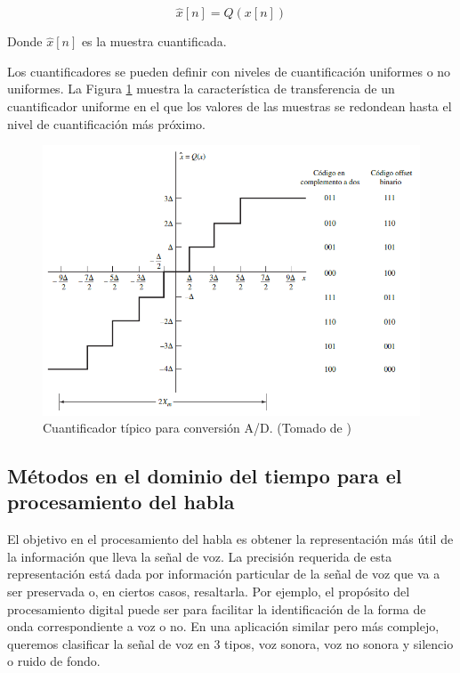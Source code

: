 \begin{equation}\label{eq:cuantificador}
	\hat{x}[n]=Q(x[n])
\end{equation}	

Donde $\hat{x}[n]$ es la muestra cuantificada.

Los cuantificadores se pueden definir con niveles de cuantificación uniformes o no uniformes. La Figura \ref{fig:cuantificadorTipico} muestra la característica de transferencia de un cuantificador uniforme en el que los valores de las muestras se redondean hasta el nivel de cuantificación más próximo.

\begin{figure}[H]
	\centering
	\includegraphics[scale = 0.6]{figures/cuantificadorTipico}
	\caption{Cuantificador típico para conversión A/D. (Tomado de \cite{Oppenheim2011})}
	\label{fig:cuantificadorTipico}
\end{figure}

\subsection{Métodos en el dominio del tiempo para el procesamiento del habla}

El objetivo en el procesamiento del habla es obtener la representación más útil de la información que lleva la señal de voz. La precisión requerida de esta representación está dada por información particular de la señal de voz que va a ser preservada o, en ciertos casos, resaltarla. Por ejemplo, el propósito del procesamiento digital puede ser para facilitar la identificación de la forma de onda correspondiente a voz o no. En una aplicación similar pero más complejo, queremos clasificar la señal de voz en 3 tipos, voz sonora, voz no sonora y silencio o ruido de fondo.

